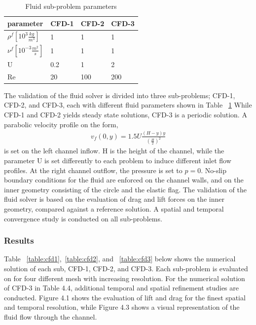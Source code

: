 \newpage
\begin{table}[h!]
\centering
\begin{tabular}{ |p{3cm}||p{2cm}|p{2cm}|p{2cm}|  }
\hline
 parameter              & CFD-1 & CFD-2 & CFD-3 \\
 \hline
$\rho^f [10^{3}\frac{kg}{m^3}]$ & 1    & 1    & 1    \\
$\nu^f  [10^{-3}\frac{m^2}{s}]$  & 1    & 1    & 1    \\
U                      & 0.2  & 1    & 2    \\
Re                     & 20   & 100  & 200 \\
\hline
\end{tabular}
\caption{Fluid sub-problem parameters}
\label{sec:cfdparam}
\end{table}
The validation of the fluid solver is divided into three sub-problems; CFD-1, CFD-2, and CFD-3, each with different fluid parameters shown in Table ~\ref{sec:cfdparam} While  CFD-1 and CFD-2 yields steady state solutions, CFD-3 is a periodic solution. A parabolic velocity profile on the form,
\begin{align*}
v_f(0, y) = 1.5 U\frac{(H -y)y}{(\frac{H}{2})^2}
\end{align*}
is set on the left channel inflow. H is the height of the channel, while the parameter U is set differently to each problem to induce different inlet flow profiles. At the right channel outflow, the pressure is set to $p = 0$. No-slip boundary conditions for the fluid are enforced on the channel walls, and on the inner geometry consisting of the circle and the elastic flag. The validation of the fluid solver is based on the evaluation of drag and lift forces on the inner geometry, compared against a reference solution. A spatial and temporal convergence study is conducted on all sub-problems. 

\subsubsection*{Results}
Table ~\ref{table:cfd1},~\ref{table:cfd2}, and ~\ref{table:cfd3} below shows the numerical solution of each sub, CFD-1, CFD-2, and CFD-3. Each sub-problem is evaluated on for four different mesh with increasing resolution. For the numerical solution of CFD-3 in Table 4.4, additional temporal and spatial refinement studies are conducted. Figure 4.1 shows the evaluation of lift and drag for the finest spatial and temporal resolution, while Figure 4.3 shows a visual representation of the fluid flow through the channel. 

